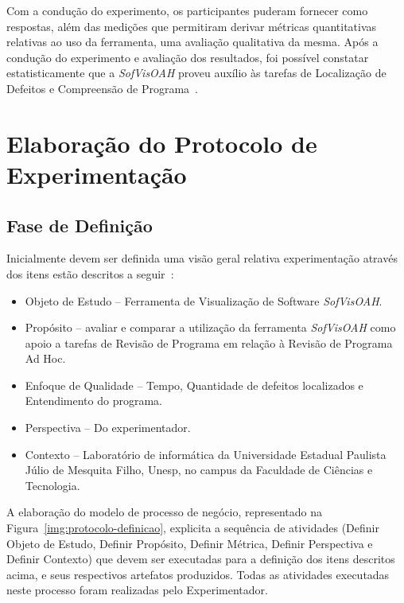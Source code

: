 Com a condução do experimento, os participantes puderam fornecer como respostas, além das medições que permitiram derivar métricas quantitativas relativas ao uso da ferramenta, uma avaliação qualitativa da mesma. Após a condução do experimento e avaliação dos resultados, foi possível constatar estatisticamente que a \textit{SofVisOAH} proveu auxílio às tarefas de Localização de Defeitos e Compreensão de Programa~\cite{d2012avaliaccao}.

\section{Elaboração do Protocolo de Experimentação}

\subsection{Fase de Definição}
Inicialmente devem ser definida uma visão geral relativa experimentação através dos itens estão descritos a seguir~\cite{d2012avaliaccao}:

\begin{itemize}

\item Objeto de Estudo -- Ferramenta de Visualização de Software \textit{SofVisOAH}.

\item Propósito -- avaliar e comparar a utilização da ferramenta \textit{SofVisOAH} como apoio a tarefas de Revisão de Programa em relação à Revisão de Programa Ad Hoc.

\item Enfoque de Qualidade -- Tempo, Quantidade de defeitos localizados e Entendimento do programa.

\item Perspectiva -- Do experimentador.

\item Contexto -- Laboratório de informática da Universidade Estadual Paulista Júlio de Mesquita Filho, Unesp, no campus da Faculdade de Ciências e Tecnologia.

\end{itemize}

A elaboração do modelo de processo de negócio, representado na Figura~\ref{img:protocolo-definicao}, explicita a sequência de atividades (Definir Objeto de Estudo, Definir Propósito, Definir Métrica, Definir Perspectiva e Definir Contexto) que devem ser executadas para a definição dos itens descritos acima, e seus respectivos artefatos produzidos. Todas as atividades executadas neste processo foram realizadas pelo Experimentador.

